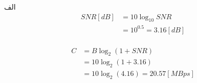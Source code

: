 \SubProblem
{الف}
{
\begin{equation*}
\begin{aligned}
    SNR[dB] & = 10\log_{10}SNR\\
            & = 10^{0.5}=3.16 [dB]
\end{aligned}
\end{equation*}
\\
\begin{equation*}
\begin{aligned}
    C       & = B\log_2(1+SNR)\\
            & = 10\log_2(1+3.16)\\
            & = 10\log_2(4.16) = 20.57 [MBps]
\end{aligned}
\end{equation*}
}